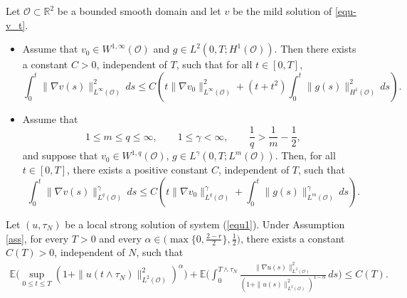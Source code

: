 \documentclass[10pt,a4paper]{amsart}
\begin{document}
\begin{lem}\label{lem_v}
	Let $\mathcal O\subset\mathbb R^2$ be a bounded smooth domain and let $v$ be the mild solution of \eqref{equ-v_t}.
    	\begin{itemize}
		\item[(i)] Assume that $v_0\in W^{1,\infty}(\mathcal O)$ and
		$g\in L^2(0,T;H^1(\mathcal O))$. Then there exists a constant $C>0$, independent of $T$, such that for all $t\in[0,T]$,
\begin{equation}\label{v_infty}
			\int_0^t \|\nabla v(s)\|_{L^\infty(\mathcal O)}^2\,ds
			\le
			C\left(
			t\|\nabla v_0\|_{L^\infty(\mathcal O)}^2
			+(t+t^2)
			\int_0^t \|g(s)\|_{H^1(\mathcal O)}^2\,ds
			\right).
		\end{equation}
		\item[(ii)] Assume that
		\[
		1\le m\le q\le \infty,\qquad 1\le \gamma<\infty,
		\qquad \frac1q>\frac1m-\frac12,
		\]
		and suppose that $v_0\in W^{1,q}(\mathcal O), \,g\in L^\gamma(0,T;L^m(\mathcal O)).$
		Then, for all $t\in[0,T]$, there exists a positive constant $C$,
		independent of $T$, such that
	\begin{equation}\label{v_r,q}
			\int_0^t \|\nabla v(s)\|_{L^q(\mathcal O)}^\gamma \,ds
			\le
			C\left(
			t\|\nabla v_0\|_{L^q(\mathcal O)}^\gamma
			+
			\int_0^t \|g(s)\|_{L^m(\mathcal O)}^\gamma \,ds
			\right).
		\end{equation}
	\end{itemize}
\end{lem}

  \begin{thm}\label{thm_estimate}
      Let $(u,\tau_N)$ be a local strong solution  of  system (\ref{equ1}). Under Assumption \ref{ass},  for every $T>0$ and every $\alpha\in\big(\max\{0,\frac{2-r}{2}\},\frac{1}{2}\big)$, there exists a constant $C(T)>0$, independent of $N$, such that 
      \begin{align}\label{est_C(T)}
	    \mathbb E\Big(\sup_{0\le t\le T}(1+\|u(t\wedge\tau_N)\|_{L^2(\mathcal{O})}^2)^\alpha\Big)+\mathbb{E}\Big(\int_0^{T\wedge{\tau_N}}
		\frac{\|\nabla u(s)\|_{L^2(\mathcal{O})}^2}{(1+\|u(s)\|_{L^2(\mathcal{O})}^2)^{1-\alpha}}\,ds\Big)
	\le C(T).
	\end{align}
  \end{thm} 
\end{document}
